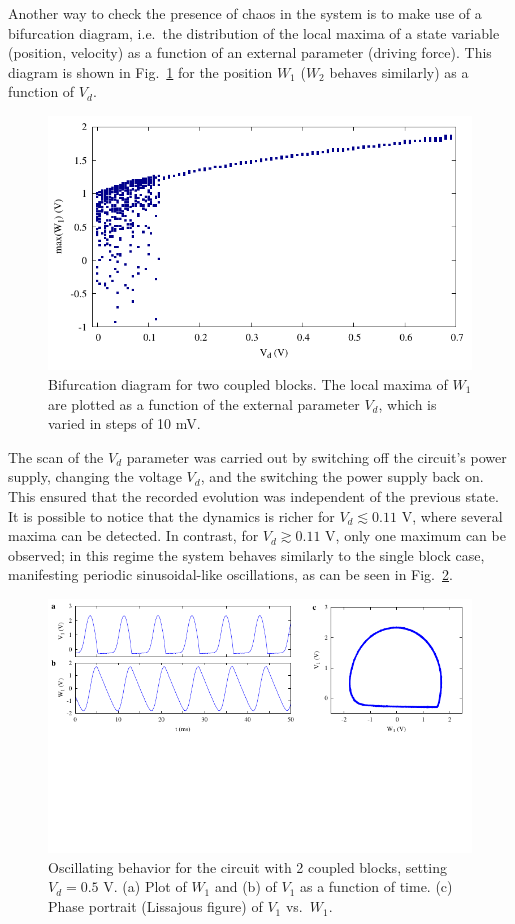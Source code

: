 Another way to check the presence of chaos in the system is to make use of a bifurcation diagram, i.e.\ the distribution
of the local maxima of a state variable (position, velocity) as a function of an external parameter (driving force).
This diagram is shown in Fig.~\ref{fig: bifurcation} for the position $W_1$ ($W_2$ behaves similarly) as a function of $V_d$.

\begin{figure}[!htbp]
    \centering
    \includegraphics[width=0.6\linewidth]{../blocks/2_blocks/bifurcation/bifurcation.pdf}
    \caption{Bifurcation diagram for two coupled blocks.
    The local maxima of $W_1$ are plotted as a function of the external parameter $V_d$,
    which is varied in steps of 10 mV.}\label{fig: bifurcation}
\end{figure}

The scan of the $V_d$ parameter was carried out by switching off the circuit's power supply, changing the voltage $V_d$,
and the switching the power supply back on. This ensured that the recorded evolution was independent of the previous state.
It is possible to notice that the dynamics is richer for $V_d\lesssim0.11$ V, where several maxima can be detected.
In contrast, for $V_d\gtrsim0.11$ V, only one maximum can be observed; in this regime the system behaves similarly
to the single block case, manifesting periodic sinusoidal-like oscillations, as can be seen in
Fig.~\ref{fig:2 blocks no chaos}.

\begin{figure}[ht!]
\centering
\includegraphics[width=\linewidth,trim={0 3.5cm 0 0},clip,center]{../blocks/2_blocks/two_blocks_nochaos.pdf}
\caption{Oscillating behavior for the circuit with 2 coupled blocks, setting $V_d=0.5$ V.
(a) Plot of $W_1$ and (b) of $V_1$ as a function of time.
(c) Phase portrait (Lissajous figure) of $V_1$ vs.\ $W_1$.
}\label{fig:2 blocks no chaos}
\end{figure}

